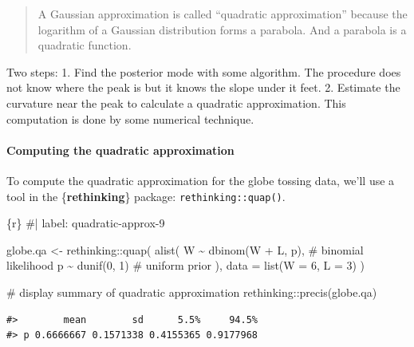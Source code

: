 \documentclass[
  letterpaper,
  DIV=11,
  numbers=noendperiod]{scrreprt}
\let\oldparagraph\paragraph
\renewcommand{\paragraph}[1]{\oldparagraph{#1}\mbox{}}
\newenvironment{Shaded}{\begin{snugshade}}{\end{snugshade}}
\newcommand{\AttributeTok}[1]{\textcolor[rgb]{0.40,0.45,0.13}{#1}}
\newcommand{\CommentTok}[1]{\textcolor[rgb]{0.37,0.37,0.37}{#1}}
\newcommand{\DecValTok}[1]{\textcolor[rgb]{0.68,0.00,0.00}{#1}}
\newcommand{\FunctionTok}[1]{\textcolor[rgb]{0.28,0.35,0.67}{#1}}
\newcommand{\InformationTok}[1]{\textcolor[rgb]{0.37,0.37,0.37}{#1}}
\newcommand{\NormalTok}[1]{\textcolor[rgb]{0.00,0.23,0.31}{#1}}
\newcommand{\OtherTok}[1]{\textcolor[rgb]{0.00,0.23,0.31}{#1}}
\newcommand{\SpecialCharTok}[1]{\textcolor[rgb]{0.37,0.37,0.37}{#1}}
\begin{document}
\begin{quote}
A Gaussian approximation is called ``quadratic approximation'' because
the logarithm of a Gaussian distribution forms a parabola. And a
parabola is a quadratic function.
\end{quote}

Two steps: 1. Find the posterior mode with some algorithm. The procedure
does not know where the peak is but it knows the slope under it feet. 2.
Estimate the curvature near the peak to calculate a quadratic
approximation. This computation is done by some numerical technique.

\hypertarget{computing-the-quadratic-approximation}{%
\paragraph{Computing the quadratic
approximation}\label{computing-the-quadratic-approximation}}

To compute the quadratic approximation for the globe tossing data, we'll
use a tool in the \{\textbf{rethinking}\} package:
\texttt{rethinking::quap()}.

\begin{Shaded}
\begin{Highlighting}[]
\InformationTok{\textasciigrave{}\textasciigrave{}\textasciigrave{}\{r\}}
\CommentTok{\#| label: quadratic{-}approx{-}9}

\NormalTok{globe.qa }\OtherTok{\textless{}{-}}\NormalTok{ rethinking}\SpecialCharTok{::}\FunctionTok{quap}\NormalTok{(}
  \FunctionTok{alist}\NormalTok{(}
\NormalTok{    W }\SpecialCharTok{\textasciitilde{}} \FunctionTok{dbinom}\NormalTok{(W }\SpecialCharTok{+}\NormalTok{ L, p), }\CommentTok{\# binomial likelihood}
\NormalTok{    p }\SpecialCharTok{\textasciitilde{}} \FunctionTok{dunif}\NormalTok{(}\DecValTok{0}\NormalTok{, }\DecValTok{1}\NormalTok{) }\CommentTok{\# uniform prior}
\NormalTok{  ),}
  \AttributeTok{data =} \FunctionTok{list}\NormalTok{(}\AttributeTok{W =} \DecValTok{6}\NormalTok{, }\AttributeTok{L =} \DecValTok{3}\NormalTok{)}
\NormalTok{)}

\CommentTok{\# display summary of quadratic approximation}
\NormalTok{rethinking}\SpecialCharTok{::}\FunctionTok{precis}\NormalTok{(globe.qa)}
\InformationTok{\textasciigrave{}\textasciigrave{}\textasciigrave{}}
\end{Highlighting}
\end{Shaded}

\begin{verbatim}
#>        mean        sd      5.5%     94.5%
#> p 0.6666667 0.1571338 0.4155365 0.9177968
\end{verbatim}
\end{document}
